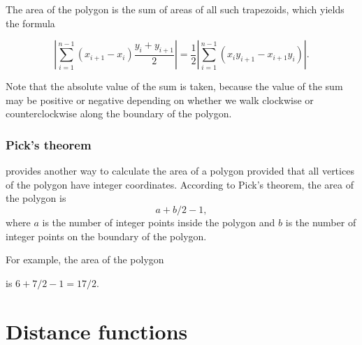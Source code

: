 The area of the polygon is the sum of areas of
all such trapezoids, which yields the formula

\[|\sum_{i=1}^{n-1} (x_{i+1}-x_{i}) \frac{y_i+y_{i+1}}{2}| =
\frac{1}{2} |\sum_{i=1}^{n-1} (x_i y_{i+1} - x_{i+1} y_i)|.\]

Note that the absolute value of the sum is taken,
because the value of the sum may be positive or negative
depending on whether we walk clockwise or counterclockwise
along the boundary of the polygon.

\subsubsection{Pick's theorem}


 provides another way to calculate
the area of a polygon provided that all vertices 
of the polygon have integer coordinates.
According to Pick's theorem, the area of the polygon is
\[ a + b/2 -1,\]
where $a$ is the number of integer points inside the polygon
and $b$ is the number of integer points on the boundary of the polygon.

For example, the area of the polygon
\begin{center}
\end{center}
is $6+7/2-1=17/2$.

\section{Distance functions}

